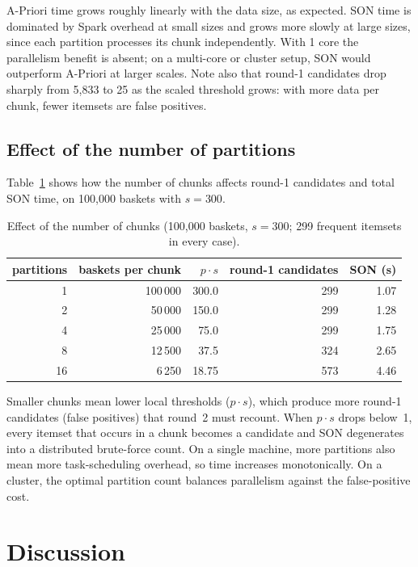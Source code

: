 \documentclass[11pt,a4paper]{article}
\begin{document}
A-Priori time grows roughly linearly with the data size, as expected. SON time is dominated by Spark
overhead at small sizes and grows more slowly at large sizes, since each partition processes its chunk
independently. With 1 core the parallelism benefit is absent; on a multi-core or cluster setup, SON
would outperform A-Priori at larger scales. Note also that round-1 candidates drop sharply from 5,833
to 25 as the scaled threshold grows: with more data per chunk, fewer itemsets are false positives.

\subsection{Effect of the number of partitions}

Table~\ref{tab:partitions} shows how the number of chunks affects round-1 candidates and total SON time,
on 100,000 baskets with $s = 300$.

\begin{table}[h]\centering
\begin{tabular}{rrrrr}\toprule
partitions & baskets per chunk & $p\cdot s$ & round-1 candidates & SON (s)\\\midrule
1 & 100\,000 & 300.0 & 299 & 1.07\\
2 & 50\,000 & 150.0 & 299 & 1.28\\
4 & 25\,000 & 75.0 & 299 & 1.75\\
8 & 12\,500 & 37.5 & 324 & 2.65\\
16 & 6\,250 & 18.75 & 573 & 4.46\\\bottomrule
\end{tabular}
\caption{Effect of the number of chunks (100,000 baskets, $s=300$; 299 frequent itemsets in every case).}
\label{tab:partitions}
\end{table}

Smaller chunks mean lower local thresholds ($p \cdot s$), which produce more round-1 candidates (false
positives) that round~2 must recount. When $p \cdot s$ drops below~1, every itemset that occurs in a chunk
becomes a candidate and SON degenerates into a distributed brute-force count. On a single machine, more
partitions also mean more task-scheduling overhead, so time increases monotonically. On a cluster, the
optimal partition count balances parallelism against the false-positive cost.

\section{Discussion}
\end{document}
